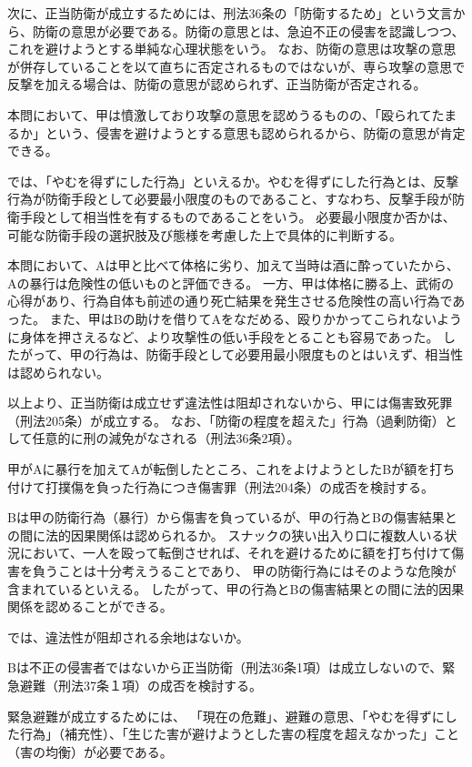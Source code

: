 \documentclass[11pt]{jsarticle}
\begin{document}
			次に、正当防衛が成立するためには、刑法36条の「防衛するため」という文言から、防衛の意思が必要である。防衛の意思とは、急迫不正の侵害を認識しつつ、これを避けようとする単純な心理状態をいう。
			なお、防衛の意思は攻撃の意思が併存していることを以て直ちに否定されるものではないが、専ら攻撃の意思で反撃を加える場合は、防衛の意思が認められず、正当防衛が否定される。
			
			本問において、甲は憤激しており攻撃の意思を認めうるものの、「殴られてたまるか」という、侵害を避けようとする意思も認められるから、防衛の意思が肯定できる。
			
			では、「やむを得ずにした行為」といえるか。やむを得ずにした行為とは、反撃行為が防衛手段として必要最小限度のものであること、すなわち、反撃手段が防衛手段として相当性を有するものであることをいう。
			必要最小限度か否かは、可能な防衛手段の選択肢及び態様を考慮した上で具体的に判断する。
			
			本問において、Aは甲と比べて体格に劣り、加えて当時は酒に酔っていたから、Aの暴行は危険性の低いものと評価できる。
			一方、甲は体格に勝る上、武術の心得があり、行為自体も前述の通り死亡結果を発生させる危険性の高い行為であった。
			また、甲はBの助けを借りてAをなだめる、殴りかかってこられないように身体を押さえるなど、より攻撃性の低い手段をとることも容易であった。
			したがって、甲の行為は、防衛手段として必要用最小限度ものとはいえず、相当性は認められない。
			
			以上より、正当防衛は成立せず違法性は阻却されないから、甲には傷害致死罪（刑法205条）が成立する。
			なお、「防衛の程度を超えた」行為（過剰防衛）として任意的に刑の減免がなされる（刑法36条2項）。
			
			
\sectionA{}
	甲がAに暴行を加えてAが転倒したところ、これをよけようとしたBが額を打ち付けて打撲傷を負った行為につき傷害罪（刑法204条）の成否を検討する。
	
	\sectionB{}
	Bは甲の防衛行為（暴行）から傷害を負っているが、甲の行為とBの傷害結果との間に法的因果関係は認められるか。
	スナックの狭い出入り口に複数人いる状況において、一人を殴って転倒させれば、それを避けるために額を打ち付けて傷害を負うことは十分考えうることであり、
	甲の防衛行為にはそのような危険が含まれているといえる。
	したがって、甲の行為とBの傷害結果との間に法的因果関係を認めることができる。
	
	\sectionB{}
	では、違法性が阻却される余地はないか。
	
	Bは不正の侵害者ではないから正当防衛（刑法36条1項）は成立しないので、緊急避難（刑法37条１項）の成否を検討する。
	
	緊急避難が成立するためには、
	「現在の危難」、避難の意思、「やむを得ずにした行為」（補充性）、「生じた害が避けようとした害の程度を超えなかった」こと（害の均衡）が必要である。
	
\end{document}
